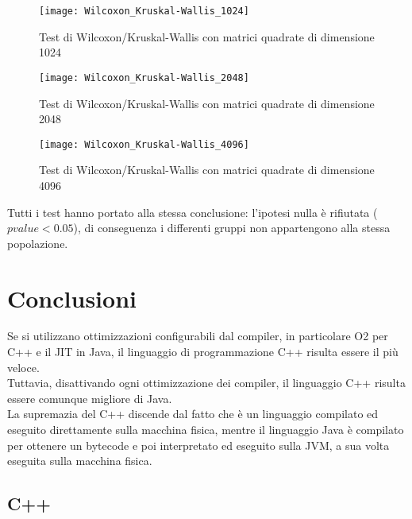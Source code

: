 \begin{figure}[!htbp]
  \centering
  \texttt{[image: Wilcoxon\_Kruskal-Wallis\_1024]}
  \caption{Test di Wilcoxon/Kruskal-Wallis con matrici quadrate di dimensione 1024}
  \label{prodottomatrici_Wilcoxon_Kruskal-Wallis_1024}
\end{figure}

\clearpage

\begin{figure}[!htbp]
  \texttt{[image: Wilcoxon\_Kruskal-Wallis\_2048]}
  \caption{Test di Wilcoxon/Kruskal-Wallis con matrici quadrate di dimensione 2048}
  \label{prodottomatrici_Wilcoxon_Kruskal-Wallis_2048}
\end{figure}

\clearpage

\begin{figure}[!htbp]
  \texttt{[image: Wilcoxon\_Kruskal-Wallis\_4096]}
  \caption{Test di Wilcoxon/Kruskal-Wallis con matrici quadrate di dimensione 4096}
  \label{prodottomatrici_Wilcoxon_Kruskal-Wallis_4096}
\end{figure}

Tutti i test hanno portato alla stessa conclusione: l'ipotesi nulla è
rifiutata ($pvalue < 0.05$), di conseguenza i differenti gruppi non appartengono
alla stessa popolazione.\\

\clearpage

\section{Conclusioni}
Se si utilizzano ottimizzazioni configurabili dal compiler, in particolare O2
per C++ e il JIT in Java, il linguaggio di programmazione C++ risulta essere il
più veloce.\\
Tuttavia, disattivando ogni ottimizzazione dei compiler, il linguaggio C++
risulta essere comunque migliore di Java.\\
La supremazia del C++ discende dal fatto che è un linguaggio compilato ed
eseguito direttamente sulla macchina fisica, mentre il linguaggio Java è compilato
per ottenere un bytecode e poi interpretato ed eseguito sulla JVM, a sua volta
eseguita sulla macchina fisica.

\subsection{C++}
